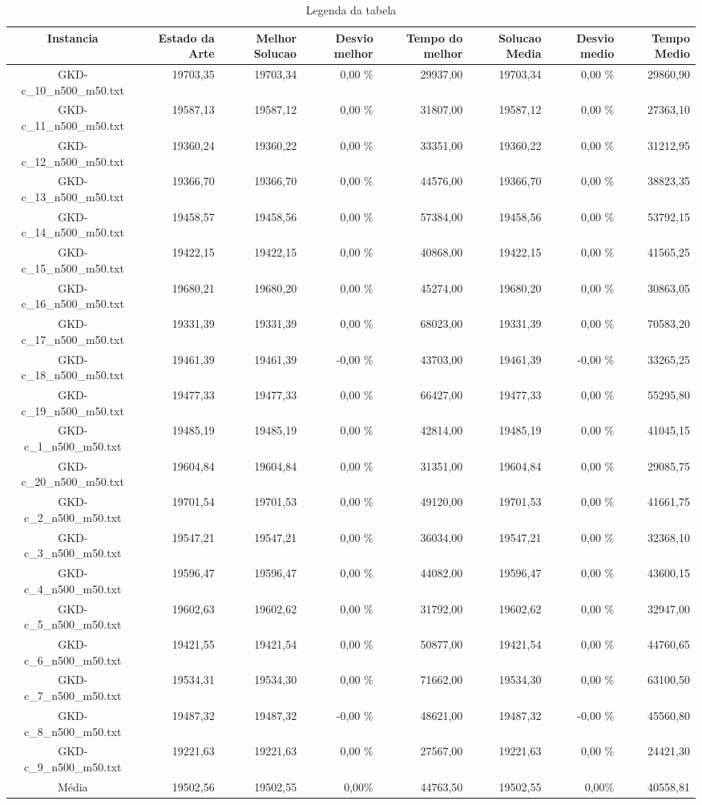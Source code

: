 \begin{landscape}
	\begin{table}[ht]
	\centering
	\begin{tabular}{| c | r | r | r | r | r | r | r |  }
\hline
Instancia&Estado da Arte&Melhor Solucao&Desvio melhor&Tempo do melhor&Solucao Media&Desvio medio&Tempo Medio\\ \hline 
		GKD-c\_10\_n500\_m50.txt&19703,35&19703,34&0,00 \%&29937,00&19703,34&0,00 \%&29860,90\\
		GKD-c\_11\_n500\_m50.txt&19587,13&19587,12&0,00 \%&31807,00&19587,12&0,00 \%&27363,10\\
		GKD-c\_12\_n500\_m50.txt&19360,24&19360,22&0,00 \%&33351,00&19360,22&0,00 \%&31212,95\\
		GKD-c\_13\_n500\_m50.txt&19366,70&19366,70&0,00 \%&44576,00&19366,70&0,00 \%&38823,35\\
		GKD-c\_14\_n500\_m50.txt&19458,57&19458,56&0,00 \%&57384,00&19458,56&0,00 \%&53792,15\\
		GKD-c\_15\_n500\_m50.txt&19422,15&19422,15&0,00 \%&40868,00&19422,15&0,00 \%&41565,25\\
		GKD-c\_16\_n500\_m50.txt&19680,21&19680,20&0,00 \%&45274,00&19680,20&0,00 \%&30863,05\\
		GKD-c\_17\_n500\_m50.txt&19331,39&19331,39&0,00 \%&68023,00&19331,39&0,00 \%&70583,20\\
		GKD-c\_18\_n500\_m50.txt&19461,39&19461,39&-0,00 \%&43703,00&19461,39&-0,00 \%&33265,25\\
		GKD-c\_19\_n500\_m50.txt&19477,33&19477,33&0,00 \%&66427,00&19477,33&0,00 \%&55295,80\\
		GKD-c\_1\_n500\_m50.txt&19485,19&19485,19&0,00 \%&42814,00&19485,19&0,00 \%&41045,15\\
		GKD-c\_20\_n500\_m50.txt&19604,84&19604,84&0,00 \%&31351,00&19604,84&0,00 \%&29085,75\\
		GKD-c\_2\_n500\_m50.txt&19701,54&19701,53&0,00 \%&49120,00&19701,53&0,00 \%&41661,75\\
		GKD-c\_3\_n500\_m50.txt&19547,21&19547,21&0,00 \%&36034,00&19547,21&0,00 \%&32368,10\\
		GKD-c\_4\_n500\_m50.txt&19596,47&19596,47&0,00 \%&44082,00&19596,47&0,00 \%&43600,15\\
		GKD-c\_5\_n500\_m50.txt&19602,63&19602,62&0,00 \%&31792,00&19602,62&0,00 \%&32947,00\\
		GKD-c\_6\_n500\_m50.txt&19421,55&19421,54&0,00 \%&50877,00&19421,54&0,00 \%&44760,65\\
		GKD-c\_7\_n500\_m50.txt&19534,31&19534,30&0,00 \%&71662,00&19534,30&0,00 \%&63100,50\\
		GKD-c\_8\_n500\_m50.txt&19487,32&19487,32&-0,00 \%&48621,00&19487,32&-0,00 \%&45560,80\\
		GKD-c\_9\_n500\_m50.txt&19221,63&19221,63&0,00 \%&27567,00&19221,63&0,00 \%&24421,30\\
\hline 		Média&19502,56&19502,55&0,00\%&44763,50&19502,55&0,00\%&40558,81\\ 
\hline
	\end{tabular}
	\caption{Legenda da tabela}
	\label{seu_label}
	\end{table}
\end{landscape}
